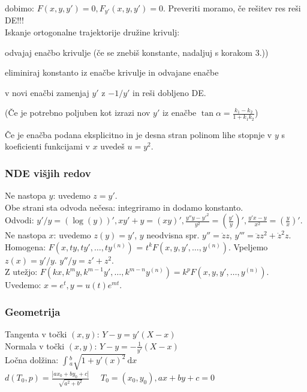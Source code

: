 \documentclass[a4paper,10pt]{article}
\theoremstyle{definition}
\newenvironment{enumerate*}%
{
\vspace{-6pt}
\begin{enumerate}
\setlength{\itemsep}{0pt}
\setlength{\parskip}{1pt}
}
{\end{enumerate}}
\newcommand{\dx}{\ensuremath{\,\mathrm{d}x}}
\let\oldint\int
\renewcommand{\int}{\oldint \!}
\begin{document}
    dobimo: $F(x, y, y') = 0, F_{y'}(x, y, y') = 0$. Preveriti moramo, če rešitev res reši DE!!! \\
Iskanje ortogonalne trajektorije družine krivulj:
\begin{enumerate*}
  \item odvajaj enačbo krivulje (če se znebiš konstante, nadaljuj s korakom 3.))
  \item eliminiraj konstanto iz enačbe krivulje in odvajane enačbe
  \item v novi enačbi zamenjaj $y'$ z $-1/y'$ in reši dobljeno DE.
  \item (Če je potrebno poljuben kot izrazi nov $y'$ iz enačbe $\tan\alpha=\frac{k_1-k_2}{1+k_1k_2}$)
\end{enumerate*}

Če je enačba podana eksplicitno in je desna stran polinom lihe stopnje v $y$ s koeficienti funkcijami v $x$ uvedeš $u=y^2$.

\subsubsection*{NDE višjih redov}
Ne nastopa $y$: uvedemo $z = y'$. \\
Obe strani sta odvoda nečesa: integriramo in dodamo konstanto. \\
\hspace*{20pt} Odvodi: $y'/y = (\log(y))', x y' + y = (xy)', \frac{y'' y - y'^2}{y^2} = (\frac{y'}{y})', \frac{y' x - y}{x^2} = (\frac{y}{x})'$.\\
Ne nastopa $x$: uvedemo $z(y) = y'$, $y$ neodvisna spr. $y'' = \dot{z}z$, $y''' =
  \ddot{z}z^2 + \dot{z}^2z$. \\
Homogena: $F(x, ty, ty', \dots, ty^{(n)})$ = $t^k F(x, y, y', \dots,  y^{(n)})$. Vpeljemo $z(x) = y'/y$. $y''/y = z' + z^2$.\\
Z utežjo: $F(kx, k^my, k^{m-1}y', \dots, k^{m-n}y^{(n)}) = k^pF(x, y, y', \dots,  y^{(n)})$. Uvedemo: $x = e^t, y = u(t)e^{mt}$.

\subsubsection*{Geometrija}
Tangenta v točki $(x,y)$: $Y-y=y'(X-x)$ \\
Normala v točki $(x,y)$: $Y-y=-\frac{1}{y'}(X-x)$\\
Ločna dolžina: $\int_a^b \sqrt{1 + y'(x)^2} \dx$ \\
$d(T_0,p)=\frac{|ax_0+by_0+c|}{\sqrt{a^2+b^2}}$ $ \quad T_0=(x_0,y_0), ax+by+c=0$
\end{document}
